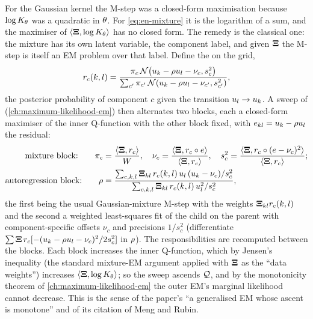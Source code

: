 For the Gaussian kernel the M-step was a closed-form maximisation because
$\log K_{\theta}$ was a quadratic in $\theta$. For \cref{eq:en-mixture} it is the
logarithm of a sum, and the maximiser of $\langle\mathbf{\Xi},\log K_{\theta}\rangle$ has no
closed form. The remedy is the classical one: the mixture has its own latent variable,
the component label, and given $\mathbf{\Xi}$ the M-step is itself an EM problem over that
label. Define the  on the grid,
\begin{equation}
  r_c(k,l)=\frac{\pi_c\,\mathcal{N}\!\left(u_{k}-\rho u_{l}-\nu_c,s_c^2\right)}
  {\sum_{c'}\pi_{c'}\,\mathcal{N}\!\left(u_{k}-\rho u_{l}-\nu_{c'},s_{c'}^2\right)},
  \label{eq:en-resp}
\end{equation}
the posterior probability of component $c$ given the transition $u_{l}\to u_{k}$.
A sweep of  (\cref{ch:maximum-likelihood-em}) then
alternates two blocks, each a closed-form maximiser of the inner Q-function with the
other block fixed, with $e_{kl}=u_{k}-\rho u_{l}$ the residual:
\begin{align}
  \text{mixture block:}\qquad
  \pi_c&=\frac{\langle\mathbf{\Xi},r_c\rangle}{W},\quad
  \nu_c=\frac{\langle\mathbf{\Xi},r_c\circ e\rangle}{\langle\mathbf{\Xi},r_c\rangle},\quad
  s_c^2=\frac{\langle\mathbf{\Xi},r_c\circ(e-\nu_c)^2\rangle}{\langle\mathbf{\Xi},r_c\rangle};
  \label{eq:en-mixblock}\\
  \text{autoregression block:}\qquad
  \rho&=\frac{\sum_{c,k,l}\mathbf{\Xi}_{kl}\,r_c(k,l)\,u_{l}\,(u_{k}-\nu_c)/s_c^2}
              {\sum_{c,k,l}\mathbf{\Xi}_{kl}\,r_c(k,l)\,u_{l}^2/s_c^2},
  \label{eq:en-rhoblock}
\end{align}
the first being the usual Gaussian-mixture M-step with the weights $\mathbf{\Xi}_{kl}r_c(k,l)$
and the second a weighted least-squares fit of the child on the parent with
component-specific offsets $\nu_c$ and precisions $1/s_c^2$ (differentiate
$\sum\mathbf{\Xi}\,r_c[-(u_{k}-\rho u_{l}-\nu_c)^2/2s_c^2]$ in $\rho$). The
responsibilities are recomputed between the blocks. Each block increases the inner
Q-function, which by Jensen's inequality (the standard mixture-EM argument applied
with $\mathbf{\Xi}$ as the ``data weights'') increases $\langle\mathbf{\Xi},\log K_{\theta}\rangle$; so the
sweep ascends $\mathcal{Q}$, and by the monotonicity theorem of
\cref{ch:maximum-likelihood-em} the outer EM's marginal likelihood cannot decrease.
This is the sense of the paper's ``a generalised EM whose ascent is monotone'' and of
its citation of Meng and Rubin.

